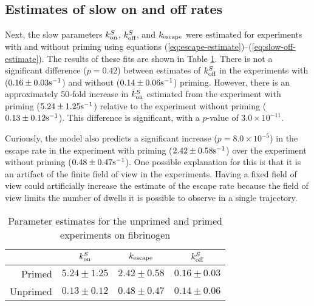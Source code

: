 \documentclass{biophys-new}
\newcommand{\tn}{\textnormal}
\newcommand{\inv}{^{-1}}
\begin{document}

\subsection*{Estimates of slow on and off rates}

Next, the slow parameters $k^S_\textnormal{on}$, $k^S_\textnormal{off}$, and $k_\textnormal{escape}$
were estimated for experiments with and without priming using
equations (\ref{eq:escape-estimate})--(\ref{eq:slow-off-estimate}).
The results of these fits are shown in Table \ref{tab:par-est}. There
is not a significant difference ($p = 0.42$) between estimates of
$k^S_\textnormal{off}$ in the experiments with ($0.16 \pm 0.03 \tn{s}\inv$) and
without ($0.14 \pm 0.06 \tn{s}\inv$) priming. However, there is an
approximately 50-fold increase in $k^S_\textnormal{on}$ estimated from the
experiment with priming ($5.24 \pm 1.25 \tn{s}\inv$) relative to the
experiment without priming ($0.13 \pm 0.12 \tn{s}\inv$). This
difference is significant, with a $p$-value of $3.0 \times 10^{-11}$.

Curiously, the model also predicts a significant increase
($p = 8.0\times 10^{-5}$) in the escape rate in the experiment with
priming ($2.42 \pm 0.58 \tn{s}\inv$) over the experiment without
priming ($0.48 \pm 0.47 \tn{s}\inv$). One possible explanation for
this is that it is an artifact of the finite field of view in the
experiments. Having a fixed field of view could artificially increase
the estimate of the escape rate because the field of view limits the
number of dwells it is possible to observe in a single trajectory.

\begin{table}
  \centering
  \caption{Parameter estimates for the unprimed and primed experiments
    on fibrinogen}
  \begin{tabular}{rccc} \toprule
    & $k^S_\textnormal{on}$ & $k_\textnormal{escape}$ & $k^S_\textnormal{off}$ \\ \midrule
    Primed & $5.24 \pm 1.25$ & $2.42 \pm 0.58$ & $0.16 \pm 0.03$ \\
    Unprimed & $0.13 \pm 0.12$ & $0.48 \pm 0.47$ & $0.14 \pm 0.06$ \\
    \bottomrule 
  \end{tabular}
  \label{tab:par-est}
\end{table}
\end{document}
